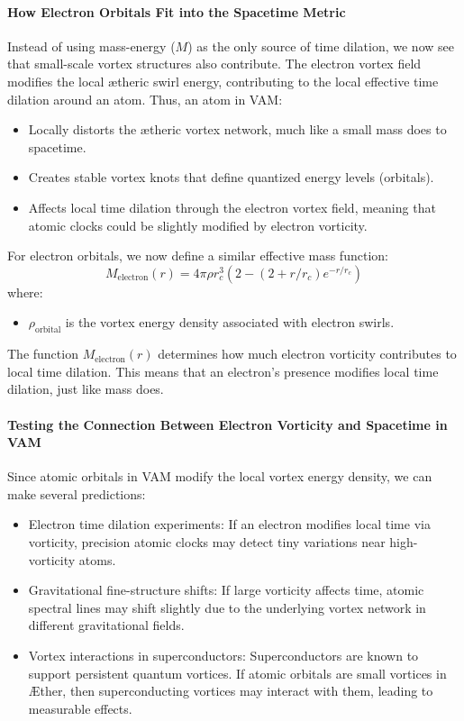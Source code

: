 \paragraph{How Electron Orbitals Fit into the Spacetime Metric}
Instead of using mass-energy ($M$) as the only source of time dilation, we now see that small-scale vortex structures also contribute.
The electron vortex field modifies the local ætheric swirl energy, contributing to the local effective time dilation around an atom.
Thus, an atom in VAM:
\begin{itemize}
    \item Locally distorts the ætheric vortex network, much like a small mass does to spacetime.
    \item Creates stable vortex knots that define quantized energy levels (orbitals).
    \item Affects local time dilation through the electron vortex field, meaning that atomic clocks could be slightly modified by electron vorticity.
\end{itemize}
For electron orbitals, we now define a similar effective mass function:
\begin{equation*}
    M_\text{electron}(r)=4 \pi \rho r_c^3  \left( 2 - (2 + r/r_c) e^{-r / r_c} \right)
\end{equation*}
where:
\begin{itemize}
    \item $\rho_\text{orbital}$ is the vortex energy density associated with electron swirls.
\end{itemize}
The function $M_\text{electron}(r)$ determines how much electron vorticity contributes to local time dilation.
This means that an electron's presence modifies local time dilation, just like mass does.

\paragraph{Testing the Connection Between Electron Vorticity and Spacetime in VAM}
Since atomic orbitals in VAM modify the local vortex energy density, we can make several predictions:
\begin{itemize}
    \item Electron time dilation experiments: If an electron modifies local time via vorticity, precision atomic clocks may detect tiny variations near high-vorticity atoms.
    \item Gravitational fine-structure shifts: If large vorticity affects time, atomic spectral lines may shift slightly due to the underlying vortex network in different gravitational fields.
    \item Vortex interactions in superconductors: Superconductors are known to support persistent quantum vortices. If atomic orbitals are small vortices in Æther, then superconducting vortices may interact with them, leading to measurable effects.
\end{itemize}

